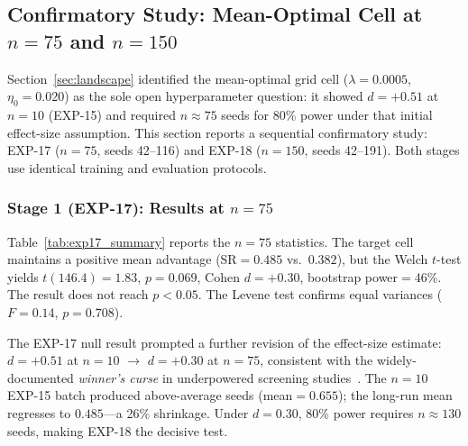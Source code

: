 \documentclass[conference]{IEEEtran}
\begin{document}
\subsection{Confirmatory Study: Mean-Optimal Cell at $n=75$ and $n=150$}
\label{subsec:confirm_mean_optimal}

Section~\ref{sec:landscape} identified the mean-optimal grid
cell ($\lambda=0.0005$, $\eta_0=0.020$) as the sole open
hyperparameter question: it showed $d=+0.51$ at $n=10$
(EXP-15) and required $n\approx75$ seeds for 80\% power
under that initial effect-size assumption.
This section reports a sequential confirmatory study:
EXP-17 ($n=75$, seeds 42--116) and EXP-18 ($n=150$,
seeds 42--191). Both stages use identical training and
evaluation protocols.

\subsubsection{Stage 1 (EXP-17): Results at $n=75$}

Table~\ref{tab:exp17_summary} reports the $n=75$
statistics. The target cell maintains a positive mean
advantage (SR$=0.485$ vs.\ $0.382$), but the Welch
$t$-test yields $t(146.4)=1.83$, $p=0.069$,
Cohen $d=+0.30$, bootstrap power$=46\%$.
The result does not reach $p<0.05$.
The Levene test confirms equal variances
($F=0.14$, $p=0.708$).

\begin{table}[t]
\centering
\caption{EXP-17: $n=75$ Stage~1 comparison, mean-optimal cell
vs.\ baseline (real S\&P~500 test split, 2022--2024).}
\label{tab:exp17_summary}
\end{table}

The EXP-17 null result prompted a further revision of the
effect-size estimate: $d=+0.51$ at $n=10$
$\rightarrow$ $d=+0.30$ at $n=75$, consistent with the
widely-documented \emph{winner's curse} in underpowered
screening studies~\cite{Button2013}. The $n=10$ EXP-15
batch produced above-average seeds (mean$=0.655$);
the long-run mean regresses to $0.485$---a 26\% shrinkage.
Under $d=0.30$, 80\% power requires $n\approx130$ seeds,
making EXP-18 the decisive test.
\end{document}
